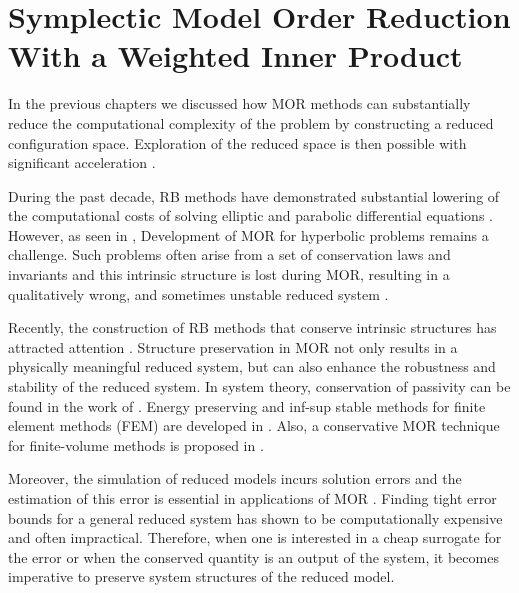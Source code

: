 \chapter{Symplectic Model Order Reduction With a Weighted Inner Product} \label{chapter:5}

In the previous chapters we discussed how MOR methods can substantially reduce the computational complexity of the problem by constructing a reduced configuration space. Exploration of the reduced space is then possible with significant acceleration \cite{hesthaven2015certified,Haasdonk2017}.

During the past decade, RB methods have demonstrated substantial lowering of the computational costs of solving elliptic and parabolic differential equations \cite{ito1998reduced,ito2001reduced}. However, as seen in , Development of MOR for hyperbolic problems remains a challenge. Such problems often arise from a set of conservation laws and invariants and this intrinsic structure is lost during MOR, resulting in a qualitatively wrong, and sometimes unstable reduced system \cite{Amsallem:2014ef}.

Recently, the construction of RB methods that conserve intrinsic structures has attracted attention \cite{doi:10.1137/17M1111991,kalashnikova2014stabilization,farhat2015structure,doi:10.1137/110836742,doi:10.1137/140959602,beattie2011structure,doi:10.1137/140978922}. Structure preservation in MOR not only results in a physically meaningful reduced system, but can also enhance the robustness and stability of the reduced system. In system theory, conservation of passivity can be found in the work of \cite{polyuga2010structure,gugercin2012structure}. Energy preserving and inf-sup stable methods for finite element methods (FEM) are developed in \cite{farhat2015structure,ballarin2015supremizer}. Also, a conservative MOR technique for finite-volume methods is proposed in \cite{1711.11550}.

Moreover, the simulation of reduced models incurs solution errors and the estimation of this error is essential in applications of MOR \cite{HaasdonkOhlberger11,RuinerEtAl12,BhattEtAl18}. Finding tight error bounds for a general reduced system has shown to be computationally expensive and often impractical. Therefore, when one is interested in a cheap surrogate for the error or when the conserved quantity is an output of the system, it becomes imperative to preserve system structures of the reduced model.

